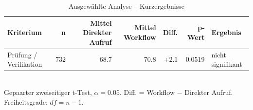 \begin{table}[htbp]
\centering
\caption{Ausgewählte Analyse -- Kurzergebnisse}
\begin{tabular}{lrrrrrl}
\toprule
Kriterium & n & Mittel Direkter Aufruf & Mittel Workflow & Diff. & p-Wert & Ergebnis \\
\midrule
Prüfung / Verifikation & 732 & 68.7 & 70.8 & +2.1 & 0.0519 & nicht signifikant \\
\bottomrule
\end{tabular}
\\[2mm]
\footnotesize Gepaarter zweiseitiger t-Test, $\alpha=0.05$. Diff. = Workflow $-$ Direkter Aufruf. Freiheitsgrade: $df=n-1$.
\end{table}
